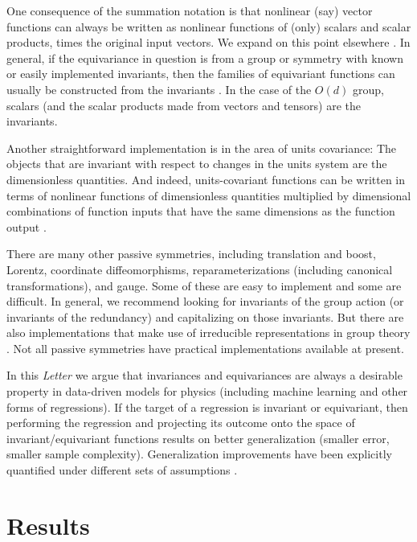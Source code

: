 \documentclass[11pt]{article}
\newcommand{\documentname}{\textsl{Letter}}
\begin{document}
One consequence of the summation notation is that nonlinear (say) vector functions can always be written as nonlinear functions of (only) scalars and scalar products, times the original input vectors.
We expand on this point elsewhere \cite{villar2021scalars}.
In general, if the equivariance in question is from a group or symmetry with known or easily implemented invariants, then the families of equivariant functions can usually be constructed from the invariants \cite{blum2022equivariant}.
In the case of the $O(d)$ group, scalars (and the scalar products made from vectors and tensors) are the invariants.

Another straightforward implementation is in the area of units covariance:
The objects that are invariant with respect to changes in the units system are the dimensionless quantities.
And indeed, units-covariant functions can be written in terms of nonlinear functions of dimensionless quantities multiplied by dimensional combinations of function inputs that have the same dimensions as the function output \cite{villar2022dimensionless}.

There are many other passive symmetries, including translation and boost, Lorentz, coordinate diffeomorphisms, reparameterizations (including canonical transformations), and gauge.
Some of these are easy to implement and some are difficult.
In general, we recommend looking for invariants of the group action (or invariants of the redundancy) and capitalizing on those invariants.
But there are also implementations that make use of irreducible representations in group theory \cite{fuchs2020se, thomas2018tensor, geiger2022e3nn}.
Not all passive symmetries have practical implementations available at present.

In this \documentname{} we argue that invariances and equivariances are always a desirable property in data-driven models for physics (including machine learning and other forms of regressions).
If the target of a regression is invariant or equivariant, then performing the regression and projecting its outcome onto the space of invariant/equivariant functions results on better generalization (smaller error, smaller sample complexity).
Generalization improvements have been explicitly quantified under different sets of assumptions \cite{bietti2021sample, elesedy2021provably, mei2021learning, elesedy2021kernel}. 

\section*{Results}
\end{document}
